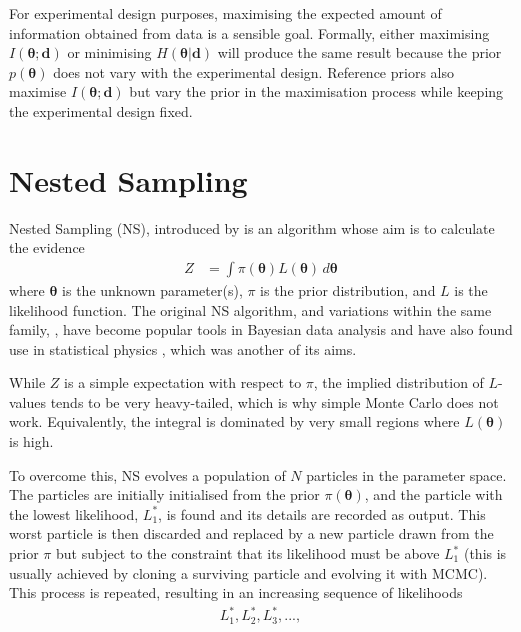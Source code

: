 \documentclass[entropy,article,accept,oneauthor,pdftex,10pt,a4paper]{mdpi}
\renewcommand{\d}{\boldsymbol{d}}
\newcommand{\x}{\boldsymbol{\theta}}
\begin{document}
For experimental design purposes, maximising the expected amount
of information obtained from data is a sensible goal.
Formally, either maximising $I(\x; \d)$ or
minimising $H(\x | \d)$ will produce the same result because the prior $p(\x)$
does not
vary with the experimental design. Reference priors
\citep{bernardo2005reference} also maximise $I(\x; \d)$ but vary the prior
in the maximisation process while keeping the experimental design fixed.

\section{Nested Sampling}

Nested Sampling (NS), introduced by
\citet{skilling2006nested} is an algorithm whose aim is
to calculate the evidence
\begin{align}
Z &= \int \pi(\x) L(\x) \, d\x
\end{align}
where $\x$ is the unknown parameter(s), $\pi$ is the prior distribution,
and $L$ is the likelihood function. The original NS algorithm, and variations
within the same family, \citep{feroz2009multinest, dns, handley2015polychord},
have become popular tools in Bayesian data analysis
\citep{pullen2014bayesian, exoplanet} and have also
found use in statistical physics \citep{partay2010efficient,
baldock2016determining, martiniani2014superposition}, which was another of
its aims.

While $Z$ is a simple expectation with
respect to $\pi$, the
implied distribution of $L$-values tends to be very heavy-tailed, which is
why simple Monte Carlo does not work. Equivalently, the integral is dominated
by very small regions where $L(\x)$ is high.

To overcome this, NS evolves a population of $N$ particles in the parameter
space.
The particles are initially initialised from the prior $\pi(\x)$, and the
particle with the lowest likelihood, $L^*_1$, is found and its details are
recorded as output. This worst particle is then discarded
and replaced by a new particle
drawn from the prior $\pi$ but subject to the constraint that its likelihood
must be above $L^*_1$ (this is usually achieved by cloning a surviving particle
and evolving it with MCMC). This process is repeated, resulting in an
increasing sequence of likelihoods
\begin{align}
L^*_1, L^*_2, L^*_3,..., \label{eqn:likelihood_sequence}
\end{align}
\end{document}
